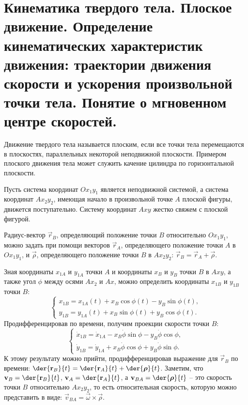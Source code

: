 \chapter{Кинематика твердого тела. Плоское движение. Определение кинематических
характеристик движения: траектории движения скорости и ускорения
произвольной точки тела. Понятие о мгновенном центре скоростей.}

Движение твердого тела называется плоским, если все точки тела перемещаются в
плоскостях, параллельных некоторой неподвижной плоскости. Примером плоского
движения тела может служить качение цилиндра по горизонтальной плоскости.

Пусть система координат \( Ox_1y_1 \) является неподвижной системой, а система
координат \( Ax_2y_2 \), имеющая начало в произвольной точке \( A \) плоской
фигуры, движется поступательно. Систему координат \( Axy \) жестко свяжем с
плоской фигурой.

Радиус-вектор \( \vec{r}_B \), определяющий положение точки \( B \) относительно
\( Ox_1y_1 \), можно задать при помощи векторов \( \vec{r}_A \), определяющего
положение точки \( A \) в \( Ox_1y_1 \), и \( \vec{\rho} \), определяющего
положение точки \( B \) в \( Ax_2y_2 \): \(\vec{r}_B = \vec{r}_A + \vec{\rho}\).

Зная координаты \( x_{1A} \) и \( y_{1A} \) точки \( A \) и координаты \( x_B \)
и \( y_B \) точки \( B \) в \( Axy \), а также угол \( \phi \) между осями
\( Ax_2 \) и \( Ax \), можно определить координаты \( x_{1B} \) и \( y_{1B} \)
точки \( B \):
\[
    \left\{ \begin{array}{l}
        x_{1B} = x_{1A}(t) + x_B\cos\phi(t) - y_B\sin\phi(t), \\
        y_{1B} = y_{1A}(t) + x_B\sin\phi(t) + y_B\cos\phi(t).
    \end{array} \right.
\]
Продифференцировав по времени, получим проекции скорости точки \( B \):
\[
    \left\{ \begin{array}{l}
        \dot{x}_{1B} = \dot{x}_{1A} - x_B\dot{\phi}\sin\phi -
        y_B\dot{\phi}\cos\phi, \\
        \dot{y}_{1B} = \dot{y}_{1A} + x_B\dot{\phi}\cos\phi +
        y_B\dot{\phi}\sin\phi.
    \end{array} \right.
\]
К этому результату можно прийти, продифференцировав выражение для
\( \vec{r}_B \) по времени: \( \ds \der{\vec{r}_B}{t} = \der{\vec{r}_A}{t} +
\der{\vec{\rho}}{t} \). Заметим, что \( \ds \vec{v}_B = \der{\vec{r}_B}{t} \),
\( \ds \vec{v}_A = \der{\vec{r}_A}{t} \), а \( \ds \vec{v}_{BA} =
\der{\vec{\rho}}{t} \) -- это скорость точки \( B \) относительно \( Ax_2y_2 \),
то есть относительная скорость, которую можно представить в виде:
\( \vec{v}_{BA} = \vec{\omega}\times\vec{\rho} \).

